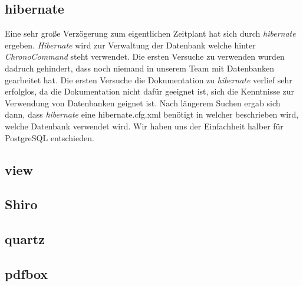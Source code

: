 \subsection{hibernate}
Eine sehr große Verzögerung zum eigentlichen Zeitplant hat sich durch \emph{hibernate} ergeben. \emph{Hibernate} wird zur Verwaltung der
Datenbank welche hinter \emph{ChronoCommand} steht verwendet. Die ersten Versuche  zu verwenden wurden dadruch
gehindert, dass noch niemand in unserem Team mit Datenbanken gearbeitet hat. Die ersten Versuche die Dokumentation zu 
\emph{hibernate} verlief sehr erfolglos, da die Dokumentation nicht dafür geeignet ist, sich die Kenntnisse zur Verwendung von
Datenbanken geignet ist. Nach längerem Suchen ergab sich dann, dass \emph{hibernate} eine hibernate.cfg.xml benötigt in welcher 
beschrieben wird, welche Datenbank verwendet wird. Wir haben uns der Einfachheit halber für PostgreSQL entschieden. 


\subsection{view} %
\subsection{Shiro} %
\subsection{quartz} %
\subsection{pdfbox} %
